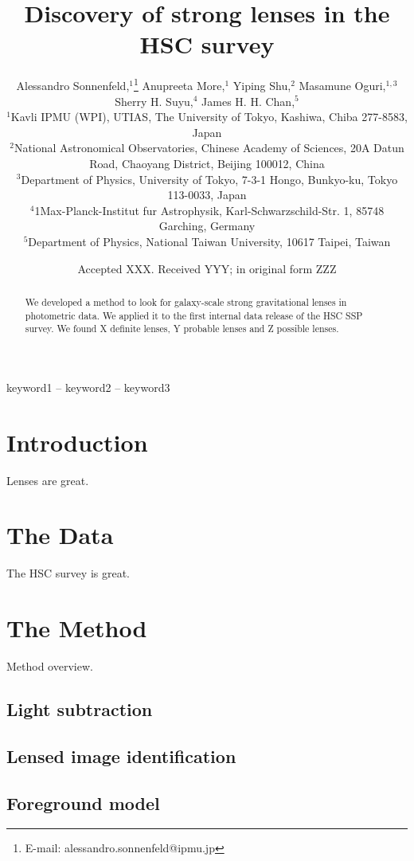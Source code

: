 \documentclass[a4paper,fleqn,usenatbib]{mnras}
\title[]{Discovery of \ngradeA strong lenses in the HSC survey}
\author[A. Sonnenfeld et al.]{
Alessandro Sonnenfeld,$^{1}$\thanks{E-mail: alessandro.sonnenfeld@ipmu.jp}
Anupreeta More,$^{1}$
Yiping Shu,$^{2}$
Masamune Oguri,$^{1,3}$
Sherry H. Suyu,$^{4}$
James H. H. Chan,$^{5}$
\\
$^{1}$Kavli IPMU (WPI), UTIAS, The University of Tokyo, Kashiwa, Chiba 277-8583, Japan \\
$^{2}$National Astronomical Observatories, Chinese Academy of
Sciences, 20A Datun Road, Chaoyang District, Beijing 100012,
China \\
$^{3}$Department of Physics, University of Tokyo, 7-3-1 Hongo, Bunkyo-ku, Tokyo 113-0033, Japan \\
$^{4}$1Max-Planck-Institut fur Astrophysik, Karl-Schwarzschild-Str. 1, 85748 Garching, Germany \\
$^{5}$Department of Physics, National Taiwan University, 10617 Taipei, Taiwan
}
\date{Accepted XXX. Received YYY; in original form ZZZ}
\begin{document}
\label{firstpage}
\pagerange{\pageref{firstpage}--\pageref{lastpage}}
\maketitle

\begin{abstract}
We developed a method to look for galaxy-scale strong gravitational lenses in photometric data. We applied it to the first internal data release of the HSC SSP survey. We found X definite lenses, Y probable lenses and Z possible lenses.
\end{abstract}

\begin{keywords}
keyword1 -- keyword2 -- keyword3
\end{keywords}



\section{Introduction}

Lenses are great.

\section{The Data}

The HSC survey is great.

\section{The Method}

Method overview.

\subsection{Light subtraction}

\subsection{Lensed image identification}

\subsection{Foreground model}
\end{document}
